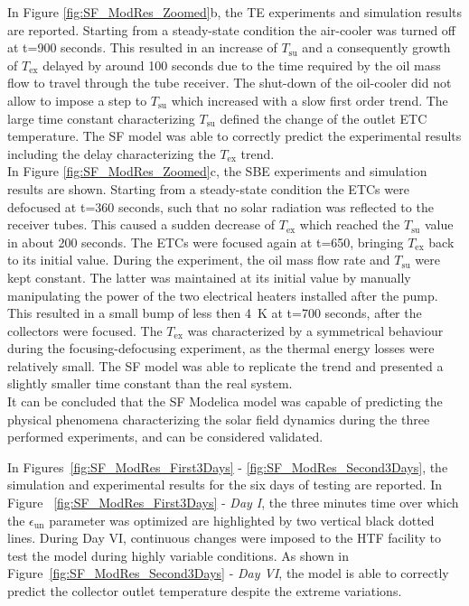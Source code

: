 \documentclass[final,3p,times,review]{elsarticle}
\begin{document}
In Figure \ref{fig:SF_ModRes_Zoomed}b, the TE experiments and simulation results are reported. Starting from a steady-state condition the air-cooler was turned off at t=900 seconds. This resulted in an increase of $T_\mathrm{su}$ and a consequently growth of $T_\mathrm{ex}$ delayed by around 100 seconds due to the time required by the oil mass flow to travel through the tube receiver. The shut-down of the oil-cooler did not allow to impose a step to $T_\mathrm{su}$ which increased with a slow first order trend. The large time constant characterizing $T_\mathrm{su}$ defined the change of the outlet ETC temperature. The SF model was able to correctly predict the experimental results including  the delay characterizing the $T_\mathrm{ex}$ trend.\\

In Figure \ref{fig:SF_ModRes_Zoomed}c, the SBE experiments and simulation results are shown. Starting from a steady-state condition the ETCs were defocused at t=360 seconds, such that no solar radiation was reflected to the receiver tubes. This caused a sudden decrease of $T_\mathrm{ex}$ which reached the $T_\mathrm{su}$ value in about 200 seconds. The ETCs were focused again at t=650, bringing $T_\mathrm{ex}$ back to its initial value. During the experiment, the oil mass flow rate and $T_\mathrm{su}$ were kept constant. The latter was maintained at its initial value by manually manipulating the power of the two electrical heaters installed after the pump. This resulted in a small bump of less then 4~K at t=700 seconds, after the collectors were focused. The $T_\mathrm{ex}$ was characterized by a symmetrical behaviour during the focusing-defocusing experiment, as the thermal energy losses were relatively small. The SF model was able to replicate the trend and presented a slightly smaller time constant than the real system.\\
It can be concluded that the SF Modelica model was capable of predicting the physical phenomena characterizing the solar field dynamics during the three performed experiments, and can be considered validated.

In Figures~\ref{fig:SF_ModRes_First3Days} - \ref{fig:SF_ModRes_Second3Days},  the simulation and experimental results for the six days of testing are reported. In Figure ~\ref{fig:SF_ModRes_First3Days} - \textit{Day I}, the three minutes time over which the $\epsilon_\mathrm{un}$ parameter was optimized are highlighted by two vertical black dotted lines. During Day VI, continuous changes were imposed to the HTF facility to test the model during highly variable conditions. As shown in Figure~\ref{fig:SF_ModRes_Second3Days} - \textit{Day VI}, the model is able to correctly predict the collector outlet temperature despite the  extreme variations.
\end{document}
